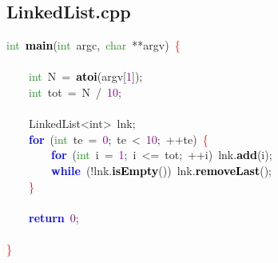 \subsection{LinkedList.cpp}
\noindent
\mbox{}\textcolor{ForestGreen}{int}\ \textbf{\textcolor{Black}{main}}\textcolor{BrickRed}{(}\textcolor{ForestGreen}{int}\ argc\textcolor{BrickRed}{,}\ \textcolor{ForestGreen}{char}\ \textcolor{BrickRed}{**}argv\textcolor{BrickRed}{)}\ \textcolor{Red}{\{} \\
\mbox{} \\
\mbox{}\ \ \ \ \textcolor{ForestGreen}{int}\ N\ \textcolor{BrickRed}{=}\ \textbf{\textcolor{Black}{atoi}}\textcolor{BrickRed}{(}argv\textcolor{BrickRed}{[}\textcolor{Purple}{1}\textcolor{BrickRed}{]);} \\
\mbox{}\ \ \ \ \textcolor{ForestGreen}{int}\ tot\ \textcolor{BrickRed}{=}\ N\ \textcolor{BrickRed}{/}\ \textcolor{Purple}{10}\textcolor{BrickRed}{;} \\
\mbox{} \\
\mbox{}\ \ \ \ \textcolor{TealBlue}{LinkedList\textless{}int\textgreater{}}\ lnk\textcolor{BrickRed}{;} \\
\mbox{}\ \ \ \ \textbf{\textcolor{Blue}{for}}\ \textcolor{BrickRed}{(}\textcolor{ForestGreen}{int}\ te\ \textcolor{BrickRed}{=}\ \textcolor{Purple}{0}\textcolor{BrickRed}{;}\ te\ \textcolor{BrickRed}{\textless{}}\ \textcolor{Purple}{10}\textcolor{BrickRed}{;}\ \textcolor{BrickRed}{++}te\textcolor{BrickRed}{)}\ \textcolor{Red}{\{} \\
\mbox{}\ \ \ \ \ \ \ \ \textbf{\textcolor{Blue}{for}}\ \textcolor{BrickRed}{(}\textcolor{ForestGreen}{int}\ i\ \textcolor{BrickRed}{=}\ \textcolor{Purple}{1}\textcolor{BrickRed}{;}\ i\ \textcolor{BrickRed}{\textless{}=}\ tot\textcolor{BrickRed}{;}\ \textcolor{BrickRed}{++}i\textcolor{BrickRed}{)}\ lnk\textcolor{BrickRed}{.}\textbf{\textcolor{Black}{add}}\textcolor{BrickRed}{(}i\textcolor{BrickRed}{);} \\
\mbox{}\ \ \ \ \ \ \ \ \textbf{\textcolor{Blue}{while}}\ \textcolor{BrickRed}{(!}lnk\textcolor{BrickRed}{.}\textbf{\textcolor{Black}{isEmpty}}\textcolor{BrickRed}{())}\ lnk\textcolor{BrickRed}{.}\textbf{\textcolor{Black}{removeLast}}\textcolor{BrickRed}{();} \\
\mbox{}\ \ \ \ \textcolor{Red}{\}} \\
\mbox{} \\
\mbox{}\ \ \ \ \textbf{\textcolor{Blue}{return}}\ \textcolor{Purple}{0}\textcolor{BrickRed}{;} \\
\mbox{} \\
\mbox{}\textcolor{Red}{\}} \\
\mbox{}

